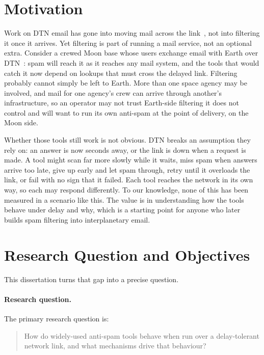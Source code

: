 \section{Motivation}

Work on DTN email has gone into moving mail across the link~\cite{johnson-dtn-interplanetary-smtp-01, blanchet-dtn-email-over-bp-06,bpmail}, not into filtering it
once it arrives. Yet filtering is part of running a mail service, not an optional
extra. Consider a crewed Moon base whose users exchange email with Earth over DTN~\cite{cosby-lunar}: spam will reach it as it reaches any mail system, and the tools that would catch it now depend on lookups that must cross the delayed link. Filtering probably cannot simply be left to Earth. More than one space agency may be involved, and mail for one agency's crew can arrive through another's infrastructure, so an operator may not trust Earth-side filtering it does not control and will want to run its own anti-spam at the point of delivery, on the Moon side.

Whether those tools still work is not obvious. DTN breaks an assumption they rely on: an answer is now seconds away, or the link is down when a request is made. A tool might scan far more slowly while it waits, miss spam when answers arrive too late, give up early and let spam through, retry until it overloads the link, or fail with no sign that it failed. Each tool reaches the network in its own way, so each may respond differently. To our knowledge, none of this has been measured in a scenario like this. The value is in understanding how the tools behave under delay and why, which is a starting point for anyone who later builds spam filtering into interplanetary email.

\section{Research Question and Objectives}

This dissertation turns that gap into a precise question.

\paragraph{Research question.}
The primary research question is:

\begin{quote}
How do widely-used anti-spam tools behave when run over a delay-tolerant network link,
and what mechanisms drive that behaviour?
\end{quote}

